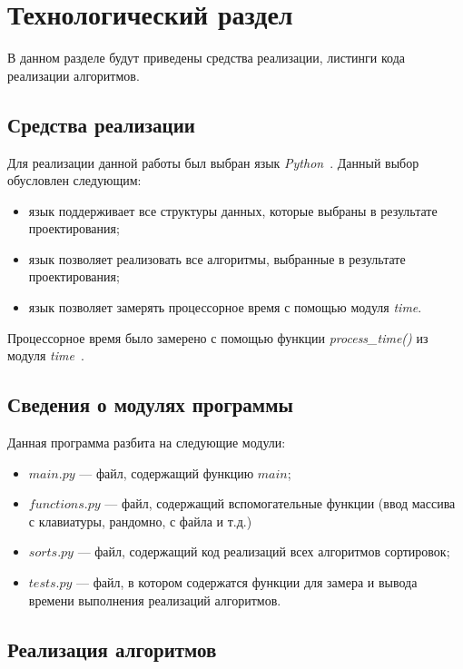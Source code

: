 \chapter{Технологический раздел}

В данном разделе будут приведены средства реализации, листинги кода реализации алгоритмов.


\section{Средства реализации}

Для реализации данной работы был выбран язык \textit{Python}~\cite{python}.
Данный выбор обусловлен следующим:
\begin{itemize}
	\item язык поддерживает все структуры данных, которые выбраны в результате проектирования;
	\item язык позволяет реализовать все алгоритмы, выбранные в результате проектирования;
	\item язык позволяет замерять процессорное время с помощью модуля \textit{time}. 
\end{itemize}

Процессорное время было замерено с помощью функции \textit{process\_time()} из модуля \textit{time}~\cite{python-time}.

\section{Сведения о модулях программы}

Данная программа разбита на следующие модули:
\begin{itemize}
	\item $main.py$ --- файл, содержащий функцию $main$;
	\item $functions.py$ --- файл, содержащий вспомогательные функции (ввод массива с клавиатуры, рандомно, с файла и т.д.)
	\item $sorts.py$ --- файл, содержащий код реализаций всех алгоритмов сортировок;
	\item $tests.py$ --- файл, в котором содержатся функции для замера и вывода времени выполнения реализаций алгоритмов.
\end{itemize}

\section{Реализация алгоритмов}

